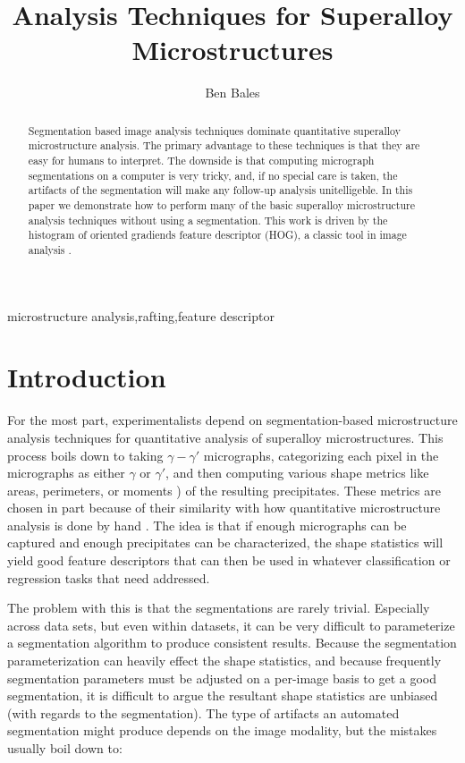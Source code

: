 \documentclass[review]{elsarticle}
\date{}
\begin{document}
	\begin{frontmatter}
		\title{Analysis Techniques for Superalloy Microstructures}

		\author{Ben Bales}
		\address{University of California Santa Barbara}

		\begin{abstract}
			Segmentation based image analysis techniques dominate quantitative superalloy microstructure analysis. The primary advantage to these techniques is that they are easy for humans to interpret. The downside is that computing micrograph segmentations on a computer is very tricky, and, if no special care is taken, the artifacts of the segmentation will make any follow-up analysis unitelligeble. In this paper we demonstrate how to perform many of the basic superalloy microstructure analysis techniques without using a segmentation. This work is driven by the histogram of oriented gradiends feature descriptor (HOG), a classic tool in image analysis \cite{gradtex, hog, girsh}.
		\end{abstract}

		\begin{keyword}
			microstructure analysis\sep rafting\sep feature descriptor
		\end{keyword}
	\end{frontmatter}

	\section{Introduction}
	For the most part, experimentalists depend on segmentation-based microstructure analysis techniques for quantitative analysis of superalloy microstructures. This process boils down to taking $\gamma-\gamma'$ micrographs, categorizing each pixel in the micrographs as either $\gamma$ or $\gamma'$, and then computing various shape metrics like areas, perimeters, or moments \cite{twoDM, threeDM}) of the resulting precipitates. These metrics are chosen in part because of their similarity with how quantitative microstructure analysis is done by hand \cite{sluytman, underwood}. The idea is that if enough micrographs can be captured and enough precipitates can be characterized, the shape statistics will yield good feature descriptors that can then be used in whatever classification or regression tasks that need addressed.

	The problem with this is that the segmentations are rarely trivial. Especially across data sets, but even within datasets, it can be very difficult to parameterize a segmentation algorithm to produce consistent results. Because the segmentation parameterization can heavily effect the shape statistics, and because frequently segmentation parameters must be adjusted on a per-image basis to get a good segmentation, it is difficult to argue the resultant shape statistics are unbiased (with regards to the segmentation). The type of artifacts an automated segmentation might produce depends on the image modality, but the mistakes usually boil down to:
\end{document}
